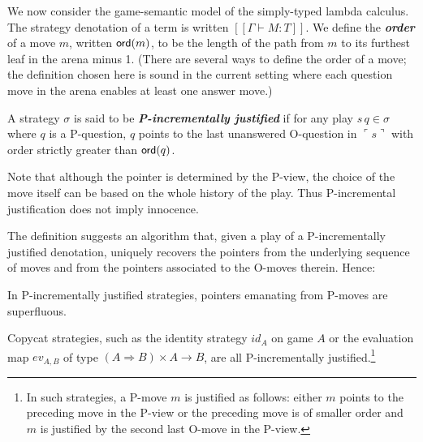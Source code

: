 \documentclass{llncs}
\newcommand\defname[1]{{\bf\em #1}\index{#1}}
\newcommand\ord[1]{{\sf
    ord}(#1)} \newcommand\typear{\rightarrow}
\newcommand{\sem}[1]{{[\![ #1 ]\!]}}
\newcommand{\pview}[1]{\ulcorner #1 \urcorner}
\begin{document}
We now consider the game-semantic model of the simply-typed lambda
calculus. The strategy denotation of a term is written $\sem{\Gamma \vdash M : T}$. We define the \defname{order} of a move $m$, written $\ord{m}$, to be the length of the path from $m$ to its furthest leaf in the arena minus 1. (There are several ways to define the order of a move; the definition chosen here is sound in the current setting where each question move in the arena enables at least one answer move.)

\begin{definition}\rm
  A strategy $\sigma$ is said to be \defname{P-incrementally
    justified} if for any play $s \, q \in \sigma$ where $q$ is a
  P-question, $q$ points to the last unanswered O-question in $\pview{s}$ with
  order strictly greater than $\ord{q}$.
\end{definition}
Note that although the pointer is determined by the P-view, the choice of the move itself
can be based on the whole history of the play. Thus P-incremental justification does not imply innocence.

The definition suggests an algorithm that, given a play of a P-incrementally justified denotation, uniquely recovers the pointers from the underlying sequence of moves and from the pointers associated to the O-moves therein. 
Hence:
\begin{lemma}
\label{lem:incrjustified_pointers_uniqu_recover} In P-incrementally justified strategies, pointers emanating from P-moves are superfluous.
\end{lemma}

\begin{example}
Copycat strategies, such as the identity strategy $id_A$ on game $A$ or the evaluation map $ev_{A,B}$ of type $(A \Rightarrow B) \times A \typear B$, are all P-incrementally justified.\footnote{In such strategies, a P-move $m$ is justified as follows: either $m$ points to the preceding move in the P-view or the preceding move is of smaller order and $m$ is justified by the second last O-move in the P-view.}
\end{example}
%
\end{document}
